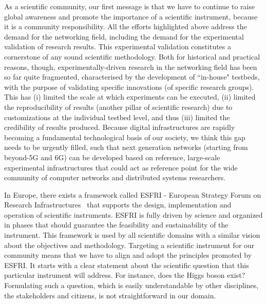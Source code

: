 As a scientific community, our first message is that we have to continue to raise global awareness and promote the importance of a scientific instrument, because it is a community responsibility. All the efforts highlighted above address the demand for the networking field, including the demand for the experimental validation of research results.
This experimental validation constitutes a cornerstone of any sound scientific methodology. Both for historical and practical reasons, though, experimentally-driven research in the networking field has been so far quite fragmented, characterised by the development of ``in-house" testbeds, with the purpose of validating specific innovations (of specific research groups). This has (i) limited the scale at which experiments can be executed, (ii) limited the reproducibility of results (another pillar of scientific research) due to customizations at the individual testbed level, and thus (iii) limited the credibility of results produced. Because digital infrastructures are rapidly becoming a fundamental technological basis of our society, we think this gap needs to be urgently filled, such that next generation networks (starting from beyond-5G and 6G) can be developed based on reference, large-scale experimental infrastructures that could act as reference point for the wide community of computer networks and distributed systems researchers.

In Europe, there exists a framework called ESFRI - European Strategy Forum on Research Infrastructures~\cite{esfri} that supports the design, implementation and operation of scientific instruments. ESFRI is fully driven by science and organized in phases that should guarantee the feasibility and sustainability of the instrument. This framework is used by all scientific domains with a similar vision about the objectives and methodology. Targeting a scientific instrument for our community means that we have to align and adopt the principles promoted by ESFRI. It starts with a clear statement about the scientific question that this particular instrument will address. For instance, does the Higgs boson exist? Formulating such a question, which is easily understandable by other disciplines, the stakeholders and citizens, is not straightforward in our domain. 


